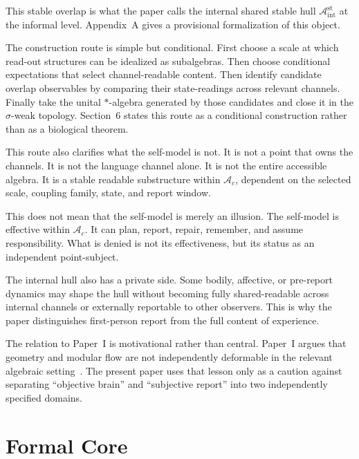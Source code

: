\documentclass[12pt]{article}
\theoremstyle{definition}
\theoremstyle{remark}
\newcommand{\Ac}{\mathcal A_c}
\newcommand{\Bint}{\mathcal A_{\mathrm{int}}^{\mathrm{st}}}
\begin{document}
This stable overlap is what the paper calls the internal shared stable
hull \(\Bint\) at the informal level. Appendix~A gives a provisional
formalization of this object.

The construction route is simple but conditional. First choose a scale
at which read-out structures can be idealized as subalgebras. Then
choose conditional expectations that select channel-readable content.
Then identify candidate overlap observables by comparing their
state-readings across relevant channels. Finally take the unital
\(*\)-algebra generated by those candidates and close it in the
\(\sigma\)-weak topology. Section~6 states this route as a conditional
construction rather than as a biological theorem.

This route also clarifies what the self-model is not. It is not a point
that owns the channels. It is not the language channel alone. It is not
the entire accessible algebra. It is a stable readable substructure
within \(\Ac\), dependent on the selected scale, coupling family, state,
and report window.

This does not mean that the self-model is merely an illusion. The
self-model is effective within \(\Ac\). It can plan, report, repair,
remember, and assume responsibility. What is denied is not its
effectiveness, but its status as an independent point-subject.

The internal hull also has a private side. Some bodily, affective, or
pre-report dynamics may shape the hull without becoming fully
shared-readable across internal channels or externally reportable to
other observers. This is why the paper distinguishes first-person
report from the full content of experience.

The relation to Paper~I is motivational rather than central. Paper~I
argues that geometry and modular flow are not independently deformable
in the relevant algebraic setting~\cite{PaperI}. The present paper uses
that lesson only as a caution against separating ``objective brain'' and
``subjective report'' into two independently specified domains.

\section{Formal Core}
\end{document}
